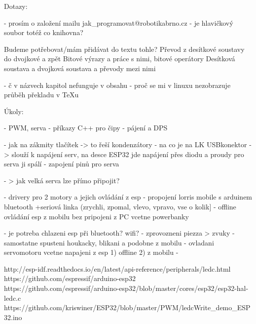 Dotazy: 

- prosím o založení mailu jak_programovat@robotikabrno.cz 
- je hlavičkový soubor totéž co knihovna? 

Budeme potřebovat/mám přidávat do textu tohle? 
Převod z desítkové soustavy do dvojkové a zpět 
Bitové výrazy a práce s nimi, bitové operátory 
Desítková soustava a dvojková soustava a převody mezi nimi 

- č v názvech kapitol nefunguje v obsahu
- proč se mi v linuxu nezobrazuje průběh překladu v TeXu 


Úkoly:

- PWM, serva  
- příkazy C++ pro čipy
- pájení a DPS 


- jak na zákmity tlačítek -> to řeší kondenzátory
- na co je na LK USBkonektor -> slouží k napájení serv, na desce ESP32 jde napájení přes diodu a proudy pro serva ji spálí
- zapojení pinů pro serva 
 
- > jak velká serva lze přímo připojit?  

 - drivery pro 2 motory a jejich ovládání z esp
- propojení lorris mobile s arduinem bluetooth +seriová linka (zrychli, zpomal, vlevo, vpravo, vse o kolik]
- offline ovládání esp z mobilu bez pripojeni z PC vcetne powerbanky 

- je potreba chlazeni esp při bluetooth? wifi?  
- zprovozneni piezza > zvuky 
- samostatne spusteni houkacky, blikani a podobne z mobilu 
- ovladani servomotoru vcetne napajeni z esp 1) offline 2) z mobilu 
- 



http://esp-idf.readthedocs.io/en/latest/api-reference/peripherals/ledc.html
https://github.com/espressif/arduino-esp32
https://github.com/espressif/arduino-esp32/blob/master/cores/esp32/esp32-hal-ledc.c
https://github.com/kriswiner/ESP32/blob/master/PWM/ledcWrite_demo_ESP32.ino
